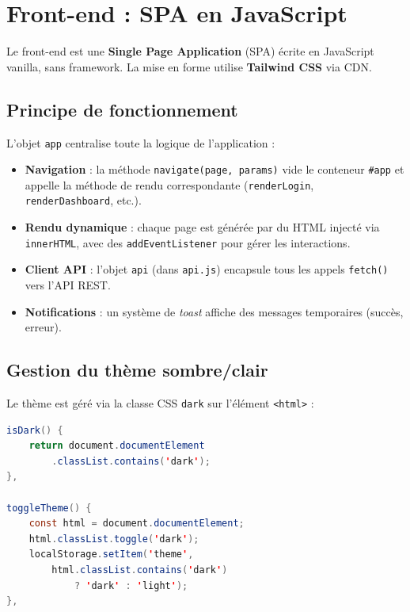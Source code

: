 \documentclass[12pt,a4paper]{report}
\begin{document}
\section{Front-end : SPA en JavaScript}

Le front-end est une \textbf{Single Page Application} (SPA) écrite en JavaScript vanilla, sans framework. La mise en forme utilise \textbf{Tailwind CSS} via CDN.

\subsection{Principe de fonctionnement}

L'objet \texttt{app} centralise toute la logique de l'application :

\begin{itemize}[noitemsep]
    \item \textbf{Navigation} : la méthode \texttt{navigate(page, params)} vide le conteneur \texttt{\#app} et appelle la méthode de rendu correspondante (\texttt{renderLogin}, \texttt{renderDashboard}, etc.).
    \item \textbf{Rendu dynamique} : chaque page est générée par du HTML injecté via \texttt{innerHTML}, avec des \texttt{addEventListener} pour gérer les interactions.
    \item \textbf{Client API} : l'objet \texttt{api} (dans \texttt{api.js}) encapsule tous les appels \texttt{fetch()} vers l'API REST.
    \item \textbf{Notifications} : un système de \textit{toast} affiche des messages temporaires (succès, erreur).
\end{itemize}

\subsection{Gestion du thème sombre/clair}

Le thème est géré via la classe CSS \texttt{dark} sur l'élément \texttt{<html>} :

\begin{lstlisting}[language=Java, caption={Gestion du thème — extrait de app.js}]
isDark() {
    return document.documentElement
        .classList.contains('dark');
},

toggleTheme() {
    const html = document.documentElement;
    html.classList.toggle('dark');
    localStorage.setItem('theme',
        html.classList.contains('dark')
            ? 'dark' : 'light');
},
\end{lstlisting}
\end{document}
